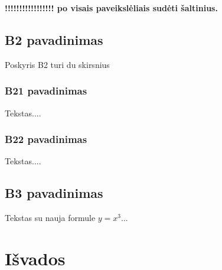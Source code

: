 \documentclass[a4paper,12pt]{article}
\begin{document}
 \textbf{!!!!!!!!!!!!!!!!! po visais paveikslėliais sudėti šaltinius.}

 \subsection{B2 pavadinimas}
 Poskyris B2 turi du skirsnius
 \subsubsection{B21 pavadinimas}
  Tekstas....
  \subsubsection{B22 pavadinimas}
  Tekstas....
 \subsection{B3 pavadinimas}
 Tekstas su nauja formule $y=x^3$...


\clearpage
\section{Išvados}
 
 
\end{document}
